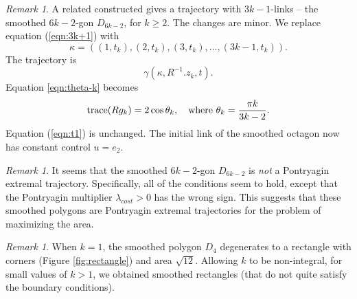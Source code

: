 \documentclass{article}
\theoremstyle{remark}
\newtheorem{remark}[equation]{Remark}%
\newcommand{\op}[1]{\hbox{#1}}
\begin{document}
\begin{remark}
A related constructed gives a trajectory with $3k-1$-links -- the
smoothed $6k-2$-gon $D_{6k-2}$, for $k\ge 2$. 
The changes are minor.  We replace equation
(\ref{eqn:3k+1}) with
\begin{equation}\label{eqn:3k+2}
\kappa = ((1,t_k),(2,t_k),(3,t_k),\ldots,(3k-1,t_k)).
\end{equation}
The trajectory is
\[
\gamma(\kappa,R^{-1}.z_k,t).
\]
Equation \ref{eqn:theta-k} becomes
\begin{equation}\label{eqn:theta-k'}
\op{trace}(R g_k) = 2\cos\theta_k,\quad 
\text{where } \theta_k= \frac{\pi k}{3k-2}.
\end{equation}
Equation (\ref{eqn:t1}) is unchanged.  The
initial link of the smoothed octagon now has constant control
$u=e_2$.
\end{remark}

\begin{remark} It seems that the smoothed $6k-2$-gon $D_{6k-2}$ is {\it
    not} a Pontryagin extremal trajectory.  Specifically, all of the
  conditions seem to hold, except that the Pontryagin multiplier
  $\lambda_{cost} >0$ has the wrong sign.  This suggests that these
  smoothed polygons are Pontryagin extremal trajectories for the
  problem of maximizing the area.
\end{remark}

\begin{remark}
  When $k=1$, the smoothed polygon $D_4$ degenerates to a rectangle
  with corners (Figure \ref{fig:rectangle}) and area $\sqrt{12}$.  Allowing
  $k$ to be non-integral, for small values of $k>1$, we obtained
  smoothed rectangles (that do not quite satisfy the boundary conditions).
\end{remark}
\end{document}
